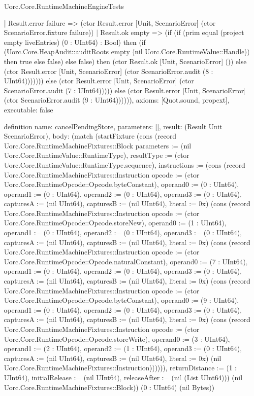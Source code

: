\begin{lexlean}{Uorc.Core.RuntimeMachineEngineTests}
\begin{semanticmodule}
{            | Result.error failure => (ctor Result.error [Unit, ScenarioError] (ctor ScenarioError.fixture failure))
            | Result.ok empty => (if (if (prim equal (project empty liveEntries) (0 : UInt64) : Bool) then (if (Uorc.Core.HeapAudit::auditRoots empty (nil Uorc.Core.RuntimeValue::Handle)) then true else false) else false) then (ctor Result.ok [Unit, ScenarioError] ()) else (ctor Result.error [Unit, ScenarioError] (ctor ScenarioError.audit (8 : UInt64))))))) else (ctor Result.error [Unit, ScenarioError] (ctor ScenarioError.audit (7 : UInt64))))) else (ctor Result.error [Unit, ScenarioError] (ctor ScenarioError.audit (9 : UInt64)))))),
  axioms: [Quot.sound, propext],
  executable: false
}

definition{
  name: cancelPendingStore,
  parameters: [],
  result: (Result Unit ScenarioError),
  body: (match (startFixture (cons (record Uorc.Core.RuntimeMachineFixtures::Block {parameters := (nil Uorc.Core.RuntimeValue::RuntimeType), resultType := (ctor Uorc.Core.RuntimeValue::RuntimeType.sequence), instructions := (cons (record Uorc.Core.RuntimeMachineFixtures::Instruction {opcode := (ctor Uorc.Core.RuntimeOpcode::Opcode.byteConstant), operand0 := (0 : UInt64), operand1 := (0 : UInt64), operand2 := (0 : UInt64), operand3 := (0 : UInt64), capturesA := (nil UInt64), capturesB := (nil UInt64), literal := 0x}) (cons (record Uorc.Core.RuntimeMachineFixtures::Instruction {opcode := (ctor Uorc.Core.RuntimeOpcode::Opcode.storeNew), operand0 := (1 : UInt64), operand1 := (0 : UInt64), operand2 := (0 : UInt64), operand3 := (0 : UInt64), capturesA := (nil UInt64), capturesB := (nil UInt64), literal := 0x}) (cons (record Uorc.Core.RuntimeMachineFixtures::Instruction {opcode := (ctor Uorc.Core.RuntimeOpcode::Opcode.naturalConstant), operand0 := (7 : UInt64), operand1 := (0 : UInt64), operand2 := (0 : UInt64), operand3 := (0 : UInt64), capturesA := (nil UInt64), capturesB := (nil UInt64), literal := 0x}) (cons (record Uorc.Core.RuntimeMachineFixtures::Instruction {opcode := (ctor Uorc.Core.RuntimeOpcode::Opcode.byteConstant), operand0 := (9 : UInt64), operand1 := (0 : UInt64), operand2 := (0 : UInt64), operand3 := (0 : UInt64), capturesA := (nil UInt64), capturesB := (nil UInt64), literal := 0x}) (cons (record Uorc.Core.RuntimeMachineFixtures::Instruction {opcode := (ctor Uorc.Core.RuntimeOpcode::Opcode.storeWrite), operand0 := (3 : UInt64), operand1 := (2 : UInt64), operand2 := (1 : UInt64), operand3 := (0 : UInt64), capturesA := (nil UInt64), capturesB := (nil UInt64), literal := 0x}) (nil Uorc.Core.RuntimeMachineFixtures::Instruction)))))), returnDistance := (1 : UInt64), initialRelease := (nil UInt64), releaseAfter := (nil (List UInt64))}) (nil Uorc.Core.RuntimeMachineFixtures::Block)) (0 : UInt64) (nil Bytes))
}
\end{semanticmodule}
\end{lexlean}
